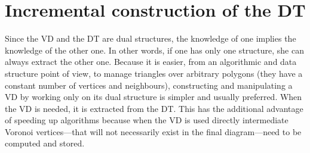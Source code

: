 %
\section[DT incremental construction]{Incremental construction of the DT}%
\label{sec:dtconstruction}

Since the VD and the DT are dual structures, the knowledge of one implies the knowledge of the other one. 
In other words, if one has only one structure, she can always extract the other one. 
Because it is easier, from an algorithmic and data structure point of view, to manage triangles over arbitrary polygons (they have a constant number of vertices and neighbours), constructing and manipulating a VD by working only on its dual structure is simpler and usually preferred. 
When the VD is needed, it is extracted from the DT\@. 
This has the additional advantage of speeding up algorithms because when the VD is used directly intermediate Voronoi vertices---that will not necessarily exist in the final diagram---need to be computed and stored.

%

